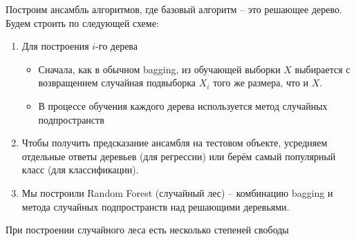 Построим ансамбль алгоритмов, где базовый алгоритм -- это решающее дерево.
Будем строить по следующей схеме:

\begin{enumerate}
    \item Для построения $i$-го дерева

    \begin{itemize}
        \item Сначала, как в обычном bagging, из обучающей выборки $X$ выбирается с возвращением случайная подвыборка
        $X_i$ того же размера, что и $X$.
        \item В процессе обучения каждого дерева используется метод случайных подпространств
    \end{itemize}

    \item Чтобы получить предсказание ансамбля на тестовом объекте, усредняем отдельные ответы деревьев
    (для регрессии) или берём самый популярный класс (для классификации).
    \item Мы построили Random Forest (случайный лес) -- комбинацию bagging и метода случайных подпространств над
    решающими деревьями.
\end{enumerate}
При построении случайного леса есть несколько степеней свободы